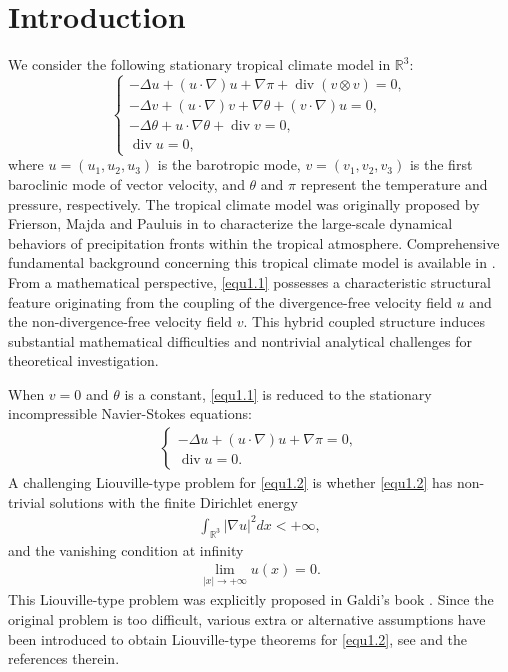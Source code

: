 \documentclass[11pt,reqno]{amsart}
\DeclareMathOperator{\divg}{div}
\numberwithin{Thm}{section}
\begin{document}
\section{Introduction}
We consider the following stationary tropical climate model in $\mathbb{R}^3$:
\begin{equation}\label{equ1.1}
  \left\{
    \begin{array}{ll}
     -\Delta u+(u\cdot\nabla) u+\nabla \pi+\divg(v\otimes v)=0,  \\
   -\Delta v+(u\cdot\nabla) v+\nabla \theta+(v\cdot\nabla)u=0, \\
   -\Delta \theta+u\cdot\nabla\theta+\divg v=0,\\
     \divg u=0,
\end{array}
  \right.
\end{equation}
where $u= (u_1 , u_2 , u_3 )$ is the barotropic mode, $v= (v_1 , v_2 , v_3 )$ is the first baroclinic mode of vector velocity, and $\theta$ and $\pi$ represent the temperature and pressure, respectively. The tropical climate model was originally proposed by Frierson, Majda and Pauluis in \cite{FMP04} to characterize the large-scale dynamical behaviors of precipitation fronts within the tropical atmosphere. Comprehensive fundamental background concerning this tropical climate model is available in \cite{LT16,Majda03,MB03}. From a mathematical perspective, \eqref{equ1.1} possesses a characteristic structural feature originating from the coupling of the divergence-free velocity field $u$ and the non-divergence-free velocity field $v$. This hybrid coupled structure induces substantial mathematical difficulties and nontrivial analytical challenges for theoretical investigation.


When $v=0$ and $\theta$ is a constant, \eqref{equ1.1} is reduced to the stationary incompressible Navier-Stokes equations:
\begin{align}\label{equ1.2}
  \left\{
    \begin{array}{ll}
     -\Delta u+(u\cdot\nabla) u+\nabla \pi=0,  \\
     \divg u=0.
\end{array}
  \right.
\end{align}
A challenging Liouville-type problem for \eqref{equ1.2} is whether \eqref{equ1.2} has non-trivial solutions with the finite Dirichlet energy
\begin{align*}
\int_{\mathbb{R}^{3}}|\nabla u|^{2}dx<+\infty,
 \end{align*}
and the vanishing condition at infinity
\begin{align*}
\lim_{|x|\rightarrow+\infty}u(x)=0.
\end{align*}
This Liouville-type problem was explicitly proposed in Galdi's book \cite[Remark X.9.4]{Galdi}.
Since the original problem is too difficult, various extra or alternative assumptions have been introduced to obtain Liouville-type theorems for \eqref{equ1.2}, see \cite{BGWX25,CPZ20,CPZZ20,Chae14,Chae25,Chae26,CW16,CW19,CJL21,CNY24,CY26a,CoY26,KNSS09,KTW17,Seregin16,Seregin18,SW19,Tsai21} and the references therein.
\end{document}
